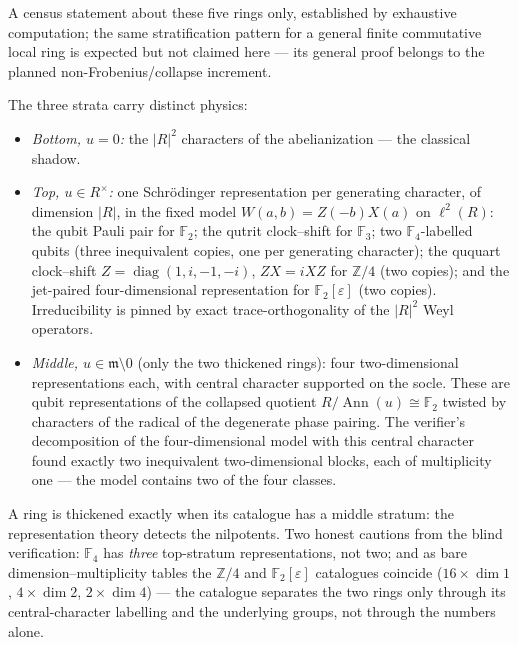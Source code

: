 \begin{scope}
A census statement about these five rings only, established by exhaustive
computation; the same stratification pattern for a general finite
commutative local ring is expected but not claimed here — its general proof
belongs to the planned non-Frobenius/collapse increment.
\end{scope}


The three strata carry distinct physics:

\begin{itemize}
\item \emph{Bottom, $u=0$:} the $|R|^{2}$ characters of the abelianization
— the classical shadow.
\item \emph{Top, $u\in R^\times$:} one Schr\"odinger representation per
generating character, of dimension $|R|$, in the fixed model
$W(a,b)=Z(-b)X(a)$ on $\ell^2(R)$: the qubit Pauli pair for $\mathbb F_2$;
the qutrit clock--shift for $\mathbb F_3$; two $\mathbb F_4$-labelled qubits
(three inequivalent copies, one per generating character); the ququart
clock--shift $Z=\operatorname{diag}(1,i,-1,-i)$, $ZX=iXZ$ for $\mathbb Z/4$
(two copies); and the jet-paired four-dimensional representation for
$\mathbb F_2[\varepsilon]$ (two copies).  Irreducibility is pinned by exact
trace-orthogonality of the $|R|^{2}$ Weyl operators.
\item \emph{Middle, $u\in\mathfrak m\setminus 0$} (only the two thickened
rings): four two-dimensional representations each, with central character
supported on the socle.  These are qubit representations of the collapsed
quotient $R/\operatorname{Ann}(u)\cong\mathbb F_2$ twisted by characters of
the radical of the degenerate phase pairing.  The verifier's decomposition
of the four-dimensional model with this central character found exactly two
inequivalent two-dimensional blocks, each of multiplicity one — the model
contains two of the four classes.
\end{itemize}

A ring is thickened exactly when its catalogue has a middle stratum: the
representation theory detects the nilpotents.  Two honest cautions from the
blind verification: $\mathbb F_4$ has \emph{three} top-stratum
representations, not two; and as bare dimension--multiplicity tables the
$\mathbb Z/4$ and $\mathbb F_2[\varepsilon]$ catalogues coincide
($16\times\dim 1$, $4\times\dim 2$, $2\times\dim 4$) — the catalogue
separates the two rings only through its central-character labelling and
the underlying groups, not through the numbers alone.

